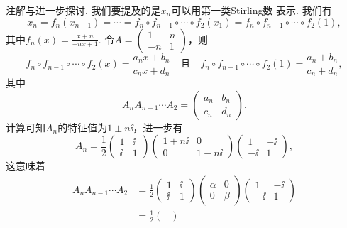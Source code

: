 \begin{solution}
\begin{inparaenum}[(a)]
        {\kaishu 注解与进一步探讨.} 我们要提及的是$x_n$可以用{\kaishu 第一类Stirling数} 表示. 我们有
        \[
          x_n = f_n(x_{n-1}) = \cdots = f_n\circ f_{n-1} \circ \cdots \circ f_2(x_1) = f_n\circ f_{n-1}\circ \cdots \circ f_2(1),
        \]
        其中$f_n(x)=\frac{x+n}{-nx+1}$. 令$A=\begin{pmatrix}
          1 & n \\
          -n & 1
        \end{pmatrix}$，则
        \[
           f_n\circ f_{n-1}\circ \cdots \circ f_2(x) = \frac{a_nx+b_n}{c_nx+d_n} \quad \text{且} \quad
            f_n\circ f_{n-1}\circ \cdots \circ f_2(1) = \frac{a_n+b_n}{c_n+d_n},
        \]
        其中
        \[
          A_nA_{n-1}\cdots A_2 = \begin{pmatrix}
            a_n & b_n \\
            c_n & d_n
          \end{pmatrix}.
        \]
        计算可知$A_n$的特征值为$1\pm n\ii$，进一步有
        \[
          A_n = \frac12\begin{pmatrix}
            1 & \ii \\
            \ii & 1
          \end{pmatrix}
          \begin{pmatrix}
            1 + n\ii & 0 \\
            0 & 1 - n\ii
          \end{pmatrix}
          \begin{pmatrix}
            1 & - \ii \\
            -\ii & 1
          \end{pmatrix},
        \]
        这意味着
        \begin{align*}
          A_nA_{n-1}\cdots A_2 & = \frac12\begin{pmatrix}
            1 & \ii \\
            \ii & 1
          \end{pmatrix}
          \begin{pmatrix}
            \alpha & 0 \\
            0 & \beta
          \end{pmatrix} \begin{pmatrix}
            1 & - \ii \\
            -\ii & 1
          \end{pmatrix} \\
          & = \frac12\begin{pmatrix}

\end{pmatrix}
\end{align*}
\end{inparaenum}
\end{solution}
